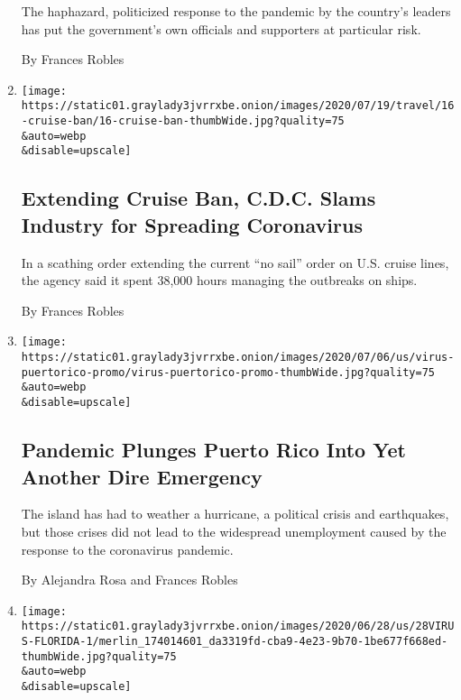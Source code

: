 \begin{enumerate}
  The haphazard, politicized response to the pandemic by the country's
  leaders has put the government's own officials and supporters at
  particular risk.

  By Frances Robles
\item
  \href{/2020/07/16/travel/coronavirus-cruise-ban-extended.html}{}

  \texttt{[image: https://static01.graylady3jvrrxbe.onion/images/2020/07/19/travel/16-cruise-ban/16-cruise-ban-thumbWide.jpg?quality=75\\\&auto=webp\\\&disable=upscale]}

  \hypertarget{extending-cruise-ban-cdc-slams-industry-for-spreading-coronavirus}{%
  \subsection{Extending Cruise Ban, C.D.C. Slams Industry for Spreading
  Coronavirus}\label{extending-cruise-ban-cdc-slams-industry-for-spreading-coronavirus}}

  In a scathing order extending the current ``no sail'' order on U.S.
  cruise lines, the agency said it spent 38,000 hours managing the
  outbreaks on ships.

  By Frances Robles
\item
  \href{/2020/07/08/us/coronavirus-puerto-rico-economy-unemployment.html}{}

  \texttt{[image: https://static01.graylady3jvrrxbe.onion/images/2020/07/06/us/virus-puertorico-promo/virus-puertorico-promo-thumbWide.jpg?quality=75\\\&auto=webp\\\&disable=upscale]}

  \hypertarget{pandemic-plunges-puerto-rico-into-yet-another-dire-emergency}{%
  \subsection{Pandemic Plunges Puerto Rico Into Yet Another Dire
  Emergency}\label{pandemic-plunges-puerto-rico-into-yet-another-dire-emergency}}

  The island has had to weather a hurricane, a political crisis and
  earthquakes, but those crises did not lead to the widespread
  unemployment caused by the response to the coronavirus pandemic.

  By Alejandra Rosa and Frances Robles
\item
  \href{/2020/06/28/us/coronavirus-florida-miami.html}{}

  \texttt{[image: https://static01.graylady3jvrrxbe.onion/images/2020/06/28/us/28VIRUS-FLORIDA-1/merlin\_174014601\_da3319fd-cba9-4e23-9b70-1be677f668ed-thumbWide.jpg?quality=75\\\&auto=webp\\\&disable=upscale]}


\end{enumerate}
